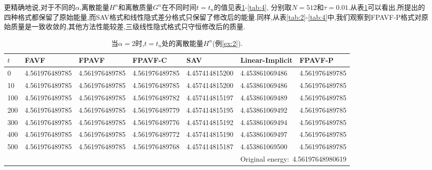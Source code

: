 	更精确地说,对于不同的$\alpha$,离散能量$H^n$和离散质量$G^n$在不同时间$t=t_n$的值见表\ref{tab:1}-\ref{tab:4},
	分别取$N=512$和$\tau=0.01$.从表\ref{tab:1}可以看出,所提出的四种格式都保留了原始能量,而SAV格式和线性隐式差分格式只保留了修改后的能量.同样,从表\ref{tab:2}-\ref{tab:4}中,我们观察到FPAVF-P格式对原始质量是一致收敛的,其他方法性能较差,三级线性隐式格式只守恒修改后的质量.

\begin{table}[H]\small
	\centering
	\caption{当$\alpha=2$时,$t=t_n$处的离散能量$H^n$(例\ref{ex:2}).}
	  \begin{tabular}{lllllll}
	  \toprule
       $t$   &FAVF   &FPAVF   &FPAVF-C   &SAV    &Linear-Implicit   &FPAVF-P\\
	  \midrule
	  0     &4.561976489785   &4.561976489785   &4.561976489785   &4.457414815200   &4.453861069486   &4.561976489785 \\
	  10    &4.561976489785   &4.561976489785   &4.561976489785   &4.457414815200   &4.453861069486   &4.561976489785 \\
	  100   &4.561976489785   &4.561976489785   &4.561976489782   &4.457414815197   &4.453861069489   &4.561976489785 \\
	  200   &4.561976489785   &4.561976489785   &4.561976489779   &4.457414815195   &4.453861069492   &4.561976489785 \\
	  300   &4.561976489785   &4.561976489785   &4.561976489776   &4.457414815192   &4.453861069494   &4.561976489785 \\
	  400   &4.561976489785   &4.561976489785   &4.561976489772   &4.457414815190   &4.453861069497   &4.561976489785 \\
	  500   &4.561976489785   &4.561976489785   &4.561976489768   &4.457414815187   &4.453861069500   &4.561976489785 \\
	  \midrule
	  \multicolumn{7}{r}{Original energy:~4.56197648980619} \\
	  \bottomrule
	  \end{tabular}\label{tab:1}%
  \end{table}%



